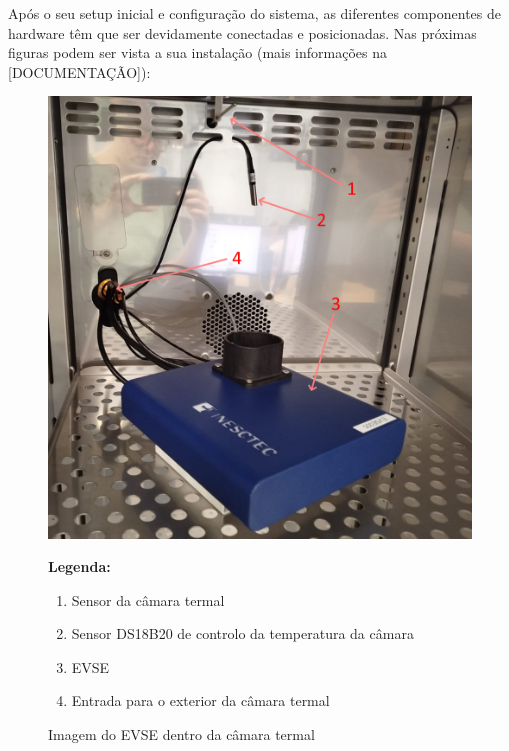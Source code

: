 Após o seu setup inicial e configuração do sistema, as diferentes componentes de hardware
têm que ser devidamente conectadas e posicionadas. Nas próximas figuras podem ser vista
a sua instalação (mais informações na [DOCUMENTAÇÃO]):

\begin{figure}[H]
    \centering
    \begin{minipage}{0.6\textwidth}
        \includegraphics[width=\linewidth]{figures/inst_inside_1.png}
    \end{minipage}%
    \hfill
    \begin{minipage}{0.35\textwidth}
        \small
        \textbf{Legenda:}
        \begin{enumerate}
            \item Sensor da câmara termal
            \item Sensor DS18B20 de controlo da temperatura da câmara
            \item EVSE
            \item Entrada para o exterior da câmara termal
        \end{enumerate}
    \end{minipage}
    \caption{Imagem do EVSE dentro da câmara termal}
    \label{fig:inst_inside_1}
\end{figure}

